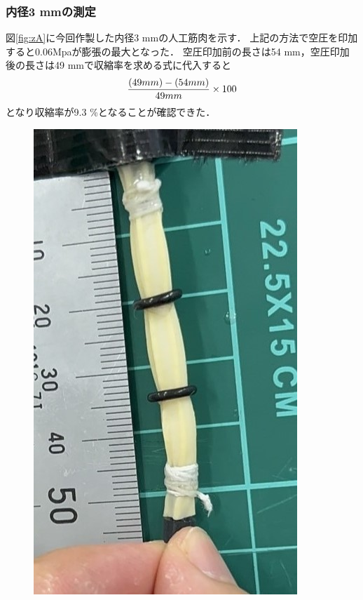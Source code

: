 \subsubsection{内径3 mmの測定}
図\ref{fig:zA}に今回作製した内径3 mmの人工筋肉を示す．
上記の方法で空圧を印加すると0.06Mpaが膨張の最大となった．
空圧印加前の長さは54 mm，空圧印加後の長さは49 mmで収縮率を求める式に代入すると
$$\frac{(49 mm)-(54 mm)}{49 mm}\times 100\\$$
となり収縮率が9.3 \%となることが確認できた．
\begin{figure}[h]
    \begin{minipage}{0.49\columnwidth}
      \vspace{4mm}
      \centering
      \includegraphics[scale=0.3]{pic/M.jpg}
    


\end{minipage}
\end{figure}
